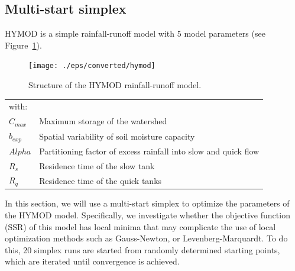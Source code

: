






\subsection{Multi-start simplex}

HYMOD \citep{boyl-gupt-soro2000} is a simple rainfall-runoff model with 5 model
parameters (see Figure~\ref{fig:hymod}).

\begin{figure}[htbp]
  \centering
    \texttt{[image: ./eps/converted/hymod]}
  \caption{Structure of the HYMOD rainfall-runoff model.}
  \label{fig:hymod}
\end{figure}
\begin{tabular}{ll}
with:&\\
$C_{max}$&Maximum storage of the watershed\\
$b_{exp}$&Spatial variability of soil moisture capacity\\
$Alpha$&Partitioning factor of excess rainfall into slow and quick flow\\
$R_{s}$&Residence time of the slow tank\\
$R_{q}$&Residence time of the quick tanks\\
\end{tabular}

In this section, we will use a multi-start simplex \citep{neld-mead1965} to
optimize the parameters of the HYMOD model. Specifically, we investigate whether
the objective function (SSR) of this model has local minima that may complicate
the use of local optimization methods such as Gauss-Newton, or
Levenberg-Marquardt. To do this, 20 simplex runs are started from randomly
determined starting points, which are iterated until convergence is achieved.

